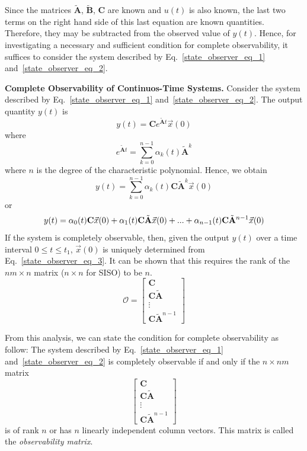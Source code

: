 \documentclass[11pt,a4paper,oneside]{book}
\numberwithin{equation}{section}
\theoremstyle{it}
\theoremstyle{definition}
\begin{document}
Since the matrices $\tilde{\mathbf{A}}$, $\tilde{\mathbf{B}}$, $\mathbf{C}$ are 
known and 
$u(t)$ is also known, the last two terms on the right hand side of this last 
equation are known quantities. Therefore, they may be subtracted from the 
observed value of $y(t)$. Hence, for investigating a necessary and sufficient 
condition for complete observability, it suffices to consider the system 
described by Eq.~\eqref{state_observer_eq_1} and~\eqref{state_observer_eq_2}.

\vspace{5mm}
\textbf{Complete Observability of Continuos-Time Systems.} Consider the system 
described by Eq.~\eqref{state_observer_eq_1} and~\eqref{state_observer_eq_2}. 
The output quantity $y(t)$ is
\begin{equation}
y(t) = \mathbf{C}e^{\tilde{\mathbf{A}}t}\vec x(0)	
\end{equation}
where
\begin{equation}
	e^{\tilde{\mathbf{A}}t} = \sum_{k=0}^{n-1} \alpha_k(t)\tilde{\mathbf{A}}^k	
\end{equation}
where $n$ is the degree of the characteristic polynomial. 
Hence, we obtain
\begin{equation}
	y(t) = \sum_{k=0}^{n-1} \alpha_k(t)\mathbf{C}\tilde{\mathbf{A}}^k\vec x(0)
\end{equation}
or
\begin{equation} \label{state_observer_eq_3}
	y(t) = \alpha_0(t)\mathbf{C}\vec x(0) + 
	\alpha_1(t)\mathbf{C}\tilde{\mathbf{A}}\vec x(0) + ... + 
	\alpha_{n-1}(t)\mathbf{C}\tilde{\mathbf{A}}^{n-1}\vec x(0) \\
\end{equation}
If the system is completely observable, then, given the output $y(t)$ over a 
time interval $0 \leq t \leq t_1$, $\vec x(0)$ is uniquely determined from 
Eq.~\eqref{state_observer_eq_3}. It can be shown that this requires the rank of 
the $nm \times n$ matrix ($n \times n$ for SISO) to be $n$.
\begin{equation} \label{state_observer_eq_4}
\mathcal{O} = \begin{bmatrix}
	\mathbf{C}  \\
	\mathbf{C}\tilde{\mathbf{A}} \\
	\vdots \\
	\mathbf{C}\tilde{\mathbf{A}}^{n-1}
\end{bmatrix}
\end{equation}

From this analysis, we can state the condition for complete observability as 
follow: The system described by Eq.~\eqref{state_observer_eq_1} 
and~\eqref{state_observer_eq_2} is completely observable if and only if the $n 
\times nm$ matrix
\begin{equation}
\begin{bmatrix}
	\mathbf{C}  \\
	\mathbf{C}\tilde{\mathbf{A}} \\
	\vdots \\
	\mathbf{C}\tilde{\mathbf{A}}^{n-1}
\end{bmatrix}
\end{equation}
is of rank $n$ or has $n$ linearly independent column vectors. This matrix is 
called the \textit{observability matrix}.
\end{document}

